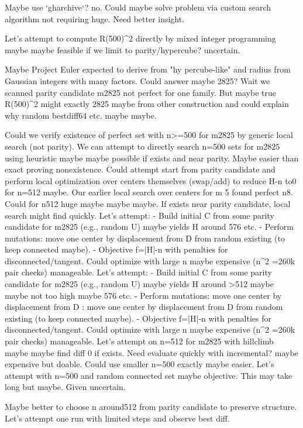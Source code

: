 \begin{decodedreasoningpanel}
Maybe use `gharchive`? no. Could maybe solve problem via custom search algorithm not requiring huge. Need better insight.

Let's attempt to compute R(500)\textasciicircum{}2 directly by mixed integer programming maybe maybe feasible if we limit to parity/hypercube? uncertain.

Maybe Project Euler expected to derive from "hy percube-like" and radius from Gaussian integers with many factors. Could answer maybe 2825? Wait we scanned parity candidate m2825 not perfect for one family. But maybe true R(500)\textasciicircum{}2 might exactly 2825 maybe from other construction and could explain why random bestdiff64 etc. maybe maybe.

Could we verify existence of perfect set with n>=500 for m2825 by generic local search (not parity). We can attempt to directly search n=500 sets for m2825 using heuristic maybe maybe possible if exists and near parity. Maybe easier than exact proving nonexistence.
Could attempt start from parity candidate and perform local optimization over centers themselves (swap/add) to reduce H-n to0 for n=512 maybe.
Our earlier local search over centers for m 5 found perfect n8. Could for n512 huge maybe maybe maybe.
If exists near parity candidate, local search might find quickly.
Let's attempt:
- Build initial C from some parity candidate for m2825 (e.g., random U) maybe yields H around 576 etc.
- Perform mutations: move one center by displacement from D from random existing (to keep connected maybe).
- Objective f=|H|-n with penalties for disconnected/tangent.
Could optimize with large n maybe expensive (n\textasciicircum{}2 =260k pair checks) manageable.
Let's attempt:
- Build initial C from some parity candidate for m2825 (e.g., random U) maybe yields H around >512 maybe maybe not too high maybe 576 etc.
- Perform mutations: move one center by displacement from D : move one center by displacement from D from random existing (to keep connected maybe).
- Objective f=|H|-n with penalties for disconnected/tangent.
Could optimize with large n maybe expensive (n\textasciicircum{}2 =260k pair checks) manageable.
Let's attempt on n=512 for m2825 with hillclimb maybe maybe find diff 0 if exists.  
Need evaluate quickly with incremental? maybe expensive but doable.  
Could use smaller n=500 exactly maybe easier.  
Let's attempt with n=500 and random connected set maybe objective.  
This may take long but maybe. Given uncertain.

Maybe better to choose n around512 from parity candidate to preserve structure. Let's attempt one run with limited steps and observe best diff.
\end{decodedreasoningpanel}

